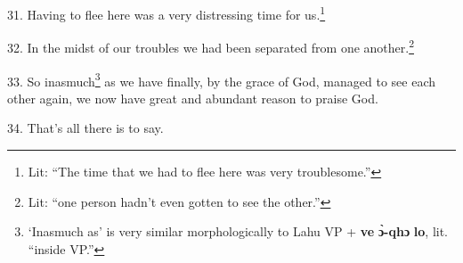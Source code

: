 31. Having to flee here was a very distressing time for us.\footnote{Lit: ``The time that we had to flee here was very troublesome.''}

32. In the midst of our troubles we had been separated from one another.\footnote{Lit: ``one person hadn't even gotten to see the other.''}

33. So inasmuch\footnote{`Inasmuch as' is very similar morphologically to Lahu VP + \textbf{ve} \textbf{ɔ̀-qhɔ} \textbf{lo}, lit. ``inside VP.''} as we have finally, by the grace of God, managed to see each
other again, we now have great and abundant reason to praise God.

34. That's all there is to say.

